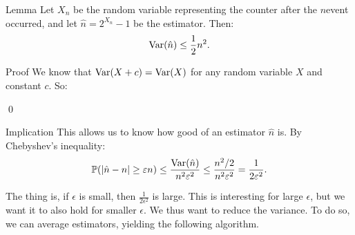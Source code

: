 \documentclass[a4paper]{article}
\begin{document}
\begin{parag}{Lemma}
    Let $X_n$ be the random variable representing the counter after the $n$\Th event occurred, and let $\hat{n} = 2^{X_n} - 1$ be the estimator. Then:
    \[\Var\left(\hat{n}\right) \leq \frac{1}{2}n^2.\]

    \begin{subparag}{Proof}
        We know that $\Var\left(X + c\right) = \Var\left(X\right)$ for any random variable $X$ and constant $c$. So: 
        
        \qed
    \end{subparag}

    \begin{subparag}{Implication}
        This allows us to know how good of an estimator $\hat{n}$ is. By Chebyshev's inequality: 
        \[\prob\left(\left|\hat{n} - n\right| \geq \epsilon n\right) \leq \frac{\Var\left(\hat{n}\right)}{n^2 \epsilon^2} \leq \frac{n^2/2}{n^2 \epsilon^2} = \frac{1}{2 \epsilon^2}.\]

        The thing is, if $\epsilon$ is small, then $\frac{1}{2 \epsilon^2}$ is large. This is interesting for large $\epsilon$, but we want it to also hold for smaller $\epsilon$. We thus want to reduce the variance. To do so, we can average estimators, yielding the following algorithm.
    \end{subparag}
\end{parag}
\end{document}
